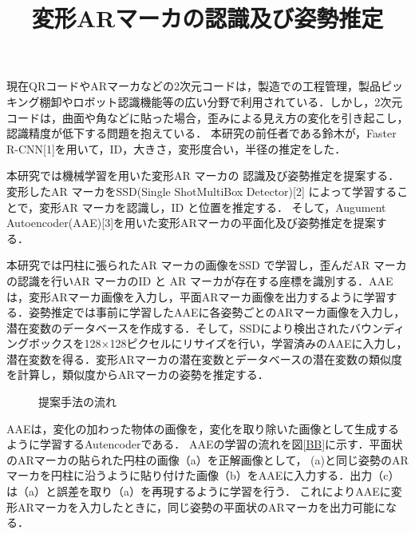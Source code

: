\documentclass{jsarticle}
\title{変形ARマーカの認識及び姿勢推定}
\begin{document}
\maketitle

現在QRコードやARマーカなどの2次元コードは，製造での工程管理，製品ピッキング棚卸やロボット認識機能等の広い分野で利用されている．しかし，2次元コードは，曲面や角などに貼った場合，歪みによる見え方の変化を引き起こし，認識精度が低下する問題を抱えている．
本研究の前任者である鈴木が，Faster R-CNN[1]を用いて，ID，大きさ，変形度合い，半径の推定をした．

本研究では機械学習を用いた変形AR マーカの
認識及び姿勢推定を提案する．
変形したAR マーカをSSD(Single ShotMultiBox Detector)[2]
 によって学習することで，変形AR マーカを認識し，ID と位置を推定する．
そして，Augument Autoencoder(AAE)[3]を用いた変形ARマーカの平面化及び姿勢推定を提案する．


本研究では円柱に張られたAR マーカの画像をSSD で学習し，歪んだAR マーカの認識を行いAR マーカのID と
AR マーカが存在する座標を識別する．AAEは，変形ARマーカ画像を入力し，平面ARマーカ画像を出力するように学習する．姿勢推定では事前に学習したAAEに各姿勢ごとのARマーカ画像を入力し，潜在変数のデータベースを作成する．そして，SSDにより検出されたバウンディングボックスを128$\times$128ピクセルにリサイズを行い，学習済みのAAEに入力し，潜在変数を得る．変形ARマーカの潜在変数とデータベースの潜在変数の類似度を計算し，類似度からARマーカの姿勢を推定する．

\begin{figure}[ht]
\vspace{0zh}
\setlength{\epsfxsize}{6.5cm}
\centerline{}
\vspace{-1zh}
\caption{提案手法の流れ}
\label{flow}
\vspace{-2zh}
\end{figure}

AAEは，変化の加わった物体の画像を，変化を取り除いた画像として生成するように学習するAutencoderである．
AAEの学習の流れを図\ref{BB}に示す．平面状のARマーカの貼られた円柱の画像（a）を正解画像として，
(a)と同じ姿勢のARマーカを円柱に沿うように貼り付けた画像（b）をAAEに入力する．出力（c）は（a）と誤差を取り（a）を再現するように学習を行う．
これによりAAEに変形ARマーカを入力したときに，同じ姿勢の平面状のARマーカを出力可能になる．
\end{document}
